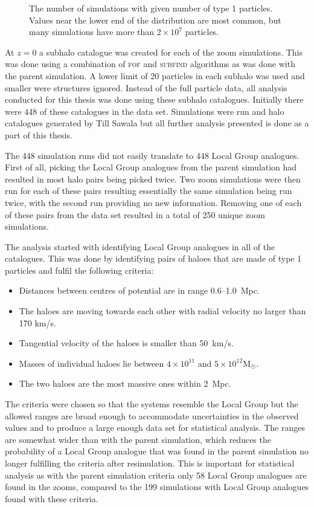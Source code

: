 \documentclass[english, oneside]{HYgradu}
\begin{document}
\begin{figure}
    \centering
    
    \caption{The number of simulations with given number of type 1 particles. Values near the lower end of the distribution are most common, but many simulations have more than $2 \times 10^7$ particles.}\label{fig:type1hist}
\end{figure}


At $z=0$ a subhalo catalogue was created for each of the zoom simulations. This was done using a combination of \textsc{fof} and \textsc{subfind} algorithms as was done with the parent simulation. A lower limit of 20 particles in each subhalo was used and smaller were structures ignored. Instead of the full particle data, all analysis conducted for this thesis was done using these subhalo catalogues. Initially there were 448 of these catalogues in the data set. Simulations were run and halo catalogues generated by Till Sawala but all further analysis presented is done as a part of this thesis.

The 448 simulation runs did not easily translate to 448 Local Group analogues. First of all, picking the Local Group analogues from the parent simulation had resulted in most halo pairs being picked twice. Two zoom simulations were then run for each of these pairs resulting essentially the same simulation being run twice, with the second run providing no new information. Removing one of each of these pairs from the data set resulted in a total of 250 unique zoom simulations.

The analysis started with identifying Local Group analogues in all of the catalogues. This was done by identifying pairs of haloes that are made of type 1 particles and fulfil the following criteria:
\begin{itemize}
\item Distances between centres of potential are in range 0.6--1.0~Mpc.
\item The haloes are moving towards each other with radial velocity no larger than 170 km/s.
\item Tangential velocity of the haloes is smaller than 50~km/s.
\item Masses of individual haloes lie between $4 \times 10^{11}$ and $5 \times 10^{12} \mathrm{M_{\astrosun}}$.
\item The two haloes are the most massive ones within 2~Mpc.
\end{itemize}
The criteria were chosen so that the systems resemble the Local Group but the allowed ranges are broad enough to accommodate uncertainties in the observed values and to produce a large enough data set for statistical analysis. The ranges are somewhat wider than with the parent simulation, which reduces the probability of a Local Group analogue that was found in the parent simulation no longer fulfilling the criteria after resimulation. This is important for statistical analysis as with the parent simulation criteria only 58 Local Group analogues are found in the zooms, compared to the 199 simulations with Local Group analogues found with these criteria.
\end{document}
